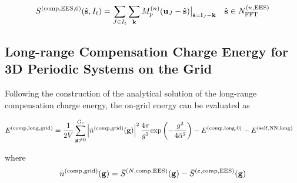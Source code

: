 \documentclass[paper=a4, fontsize=11pt]{article} %
\numberwithin{equation}{section} %
\numberwithin{figure}{section} %
\numberwithin{table}{section} %
\newcommand{\bu}{{\bf{u}}}
\newcommand{\bl}{{\bf{l}}}
\newcommand{\bk}{{\bf{k}}}
\newcommand{\bs}{{\bf{s}}}
\newcommand{\bg}{{\bf{g}}}
\newcommand{\hs}{{\hat{\bf{s}}}}
\newcommand{\rexp}{{\mathrm{exp}}}
\newcommand{\rEES}{{\mathrm{EES}}}
\newcommand{\rNN}{{\mathrm{NN}}}
\newcommand{\rself}{{\mathrm{self}}}
\newcommand{\rlong}{{\mathrm{long}}}
\newcommand{\rcomp}{{\mathrm{comp}}}
\newcommand{\rgrid}{{\mathrm{grid}}}
\newcommand{\NFFTnEES}{{N^{(n,\rEES)}_{\mathrm{FFT}}}}
\newcommand{\Gc}{{G_{\mathrm{c}}}}
\newcommand{\bal}{{\bar{\alpha}}}
\begin{document}
\begin{equation}
\begin{split}
S^{(\rcomp,\rEES,0)}(\hs,I_t) &=\sum_{J\in I_t}\sum_{\bk}  M_p^{(n)}(\bu_{J}-\hat \bs)\big|_{\hs=\bl_{J}-\bk}\ \ \  \hs \in \NFFTnEES\\
\end{split}
\end{equation}


\subsection{Long-range Compensation Charge Energy for 3D Periodic Systems on the Grid}
Following the construction of the analytical solution of the long-range compensation charge energy, the on-grid energy can be evaluated as

\begin{equation}
\begin{split}
E^{(\rcomp,\rlong,\rgrid)} 
&= \frac{1}{2V} \sum_{\bg \neq 0}^{\Gc} \left|\bar n ^{(\rcomp,\rgrid)}(\bg)\right|^2 \frac{4\pi}{g^2} \rexp\left(-\frac{g^2}{4\bal^2}\right) - E^{(\rcomp,\rlong,0)} - E^{(\rself,\rNN,\rlong)}
\end{split}
\end{equation}

where
\begin{equation}
\bar n ^{(\rcomp,\rgrid)}(\bg)
= \bar S^{(N,\rcomp,\rEES)}(\bg) - \bar S^{(e,\rcomp,\rEES)}(\bg)
\end{equation}
\end{document}

